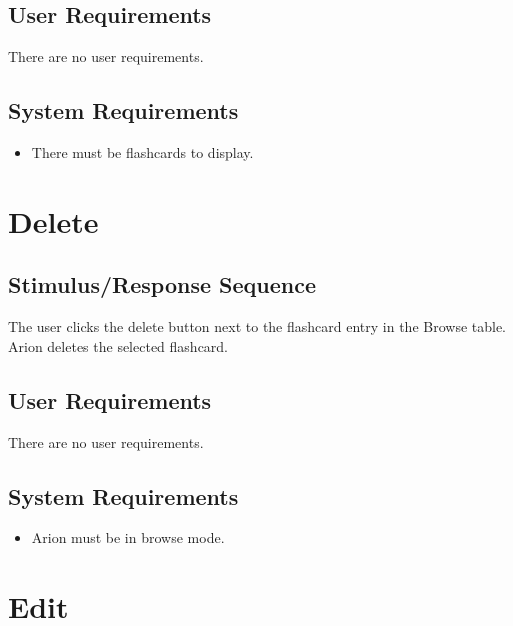 \documentclass{scrreprt}
\begin{document}
    \subsection*{User Requirements}
    There are no user requirements.

    \subsection*{System Requirements}
        \begin{itemize}
            \item There must be flashcards to display.
        \end{itemize}

\section{Delete}
    \subsection*{Stimulus/Response Sequence}
        \begin{flushleft}
             The user clicks the delete button next to the flashcard entry in the Browse table. \\
             Arion deletes the selected flashcard. \\
        \end{flushleft}

    \subsection*{User Requirements}
        There are no user requirements.

    \subsection*{System Requirements}
        \begin{itemize}
            \item Arion must be in browse mode.
        \end{itemize}

\section{Edit}
\end{document}

